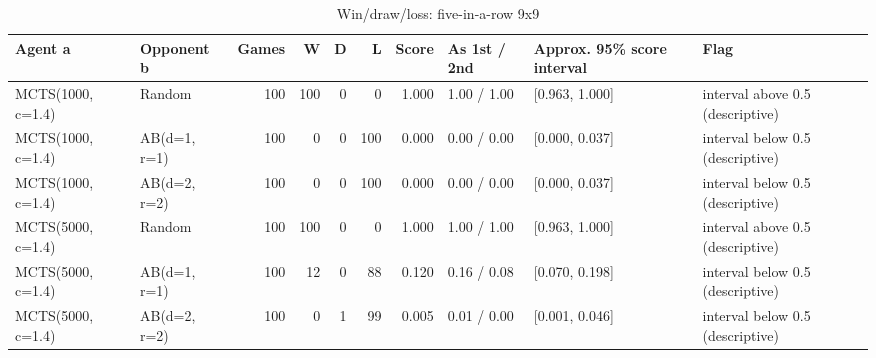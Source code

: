 \begin{table}[!t]
\centering
\caption{Win/draw/loss: five-in-a-row 9x9}
\label{tab:wdl_gomoku9}
\small
\begin{tabular}{llrrrrrlll}
\toprule
Agent a & Opponent b & Games & W & D & L & Score & As 1st / 2nd & Approx. 95\% score interval & Flag \\
\midrule
MCTS(1000, c=1.4) & Random & 100 & 100 & 0 & 0 & 1.000 & 1.00 / 1.00 & [0.963, 1.000] & interval above 0.5 (descriptive) \\
MCTS(1000, c=1.4) & AB(d=1, r=1) & 100 & 0 & 0 & 100 & 0.000 & 0.00 / 0.00 & [0.000, 0.037] & interval below 0.5 (descriptive) \\
MCTS(1000, c=1.4) & AB(d=2, r=2) & 100 & 0 & 0 & 100 & 0.000 & 0.00 / 0.00 & [0.000, 0.037] & interval below 0.5 (descriptive) \\
MCTS(5000, c=1.4) & Random & 100 & 100 & 0 & 0 & 1.000 & 1.00 / 1.00 & [0.963, 1.000] & interval above 0.5 (descriptive) \\
MCTS(5000, c=1.4) & AB(d=1, r=1) & 100 & 12 & 0 & 88 & 0.120 & 0.16 / 0.08 & [0.070, 0.198] & interval below 0.5 (descriptive) \\
MCTS(5000, c=1.4) & AB(d=2, r=2) & 100 & 0 & 1 & 99 & 0.005 & 0.01 / 0.00 & [0.001, 0.046] & interval below 0.5 (descriptive) \\
\bottomrule
\end{tabular}
\end{table}
